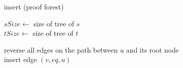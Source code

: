 \begin{algorithm}[h]
\caption[.]{insert (proof forest)}
	
	
	$sSize \leftarrow $ size of tree of $s$ \\ %
	$tSize \leftarrow $ size of tree of $t$ %
	

	reverse all edges on the path between $u$ and its root node \\
	insert edge $(v,eq,u)$%

  \label{algo:insert_pt}
\end{algorithm}
